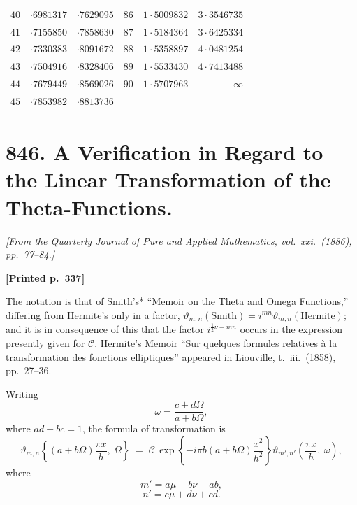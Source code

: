 \documentclass[11pt]{article}
\begin{document}
\begin{center}
\begin{tabular}{|r|r|r||r|r|r|}
$40$ & $\cdot 6981317$ & $\cdot 7629095$ & $86$ & $1\cdot 5009832$ & $3\cdot 3546735$ \\
$41$ & $\cdot 7155850$ & $\cdot 7858630$ & $87$ & $1\cdot 5184364$ & $3\cdot 6425334$ \\
$42$ & $\cdot 7330383$ & $\cdot 8091672$ & $88$ & $1\cdot 5358897$ & $4\cdot 0481254$ \\
$43$ & $\cdot 7504916$ & $\cdot 8328406$ & $89$ & $1\cdot 5533430$ & $4\cdot 7413488$ \\
$44$ & $\cdot 7679449$ & $\cdot 8569026$ & $90$ & $1\cdot 5707963$ & $\infty$ \\
$45$ & $\cdot 7853982$ & $\cdot 8813736$ & & & \\
\hline
\end{tabular}
\end{center}

\newpage


\section*{846. A Verification in Regard to the Linear Transformation of the Theta-Functions.}

\noindent\textit{[From the Quarterly Journal of Pure and Applied Mathematics, vol.~xxi.\ (1886), pp.~77--84.]}

\medskip

\noindent\textbf{[Printed p.~337]}\hfill

The notation is that of Smith's* ``Memoir on the Theta and Omega Functions,'' differing from Hermite's only in a factor, $\vartheta_{m,n}(\mathrm{Smith}) = i^{mn}\vartheta_{m,n}(\mathrm{Hermite})$; and it is in consequence of this that the factor $i^{\frac{1}{2}\nu - mn}$ occurs in the expression presently given for $\mathcal{C}$. Hermite's Memoir ``Sur quelques formules relatives \`a la transformation des fonctions elliptiques'' appeared in Liouville, t.~iii.\ (1858), pp.~27--36.

\medskip


Writing
\[
\omega = \frac{c + d\Omega}{a + b\Omega},
\]
where $ad - bc = 1$, the formula of transformation is
\[
\vartheta_{m,n}\!\left\{(a+b\Omega)\frac{\pi x}{h},\ \Omega\right\} \;=\; \mathcal{C}\,\exp\!\left\{-i\pi b(a+b\Omega)\frac{x^{2}}{h^{2}}\right\}\vartheta_{m',n'}\!\left(\frac{\pi x}{h},\ \omega\right),
\]
where
\[
m' = a\mu + b\nu + ab,
\]
\[
n' = c\mu + d\nu + cd.
\]
\end{document}
